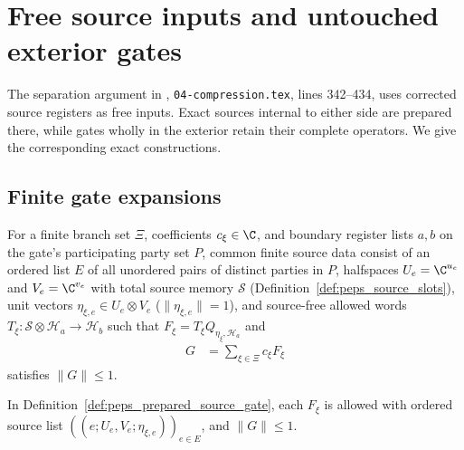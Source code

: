 \section{Free source inputs and untouched exterior gates}

The separation argument in
\cite[proof of Theorem~5.2]{OpenAI2026PolynomialPEPS},
\texttt{04-compression.tex}, lines 342--434, uses corrected source
registers as free inputs. Exact sources internal to either side are
prepared there, while gates wholly in the exterior retain their
complete operators. We give the corresponding exact constructions.


\subsection{Finite gate expansions}

\begin{definition}
    \label{def:peps_prepared_source_gate}
    \leanok
    For a finite branch set $\Xi$, coefficients $c_\xi\in\C$, and boundary
    register lists $a,b$ on the gate's participating party set $P$, common
    finite source data consist of an ordered list $E$ of all unordered pairs of
    distinct parties in $P$, halfspaces $U_e=\C^{u_e}$ and $V_e=\C^{v_e}$ with
    total source memory $\mathcal S$ (Definition~\ref{def:peps_source_slots}),
    unit vectors $\eta_{\xi,e}\in U_e\otimes V_e$ ($\|\eta_{\xi,e}\|=1$), and
    source-free allowed words $T_\xi:\mathcal S\otimes\mathcal H_a\to\mathcal H_b$
    such that $F_\xi=T_\xi Q_{\eta_\xi,\mathcal H_a}$ and
    \begin{align}
        G & =\sum_{\xi\in\Xi}c_\xi F_\xi
        \label{eq:peps_prepared_gate_sum}
    \end{align}
    satisfies $\|G\|\leq1$.
\end{definition}

\begin{lemma}
    \label{thm:peps_prepared_gate_properties}
    \leanok
    In Definition~\ref{def:peps_prepared_source_gate}, each $F_\xi$ is allowed
    with ordered source list $((e;U_e,V_e;\eta_{\xi,e}))_{e\in E}$, and
    $\|G\|\le 1$.
\end{lemma}

